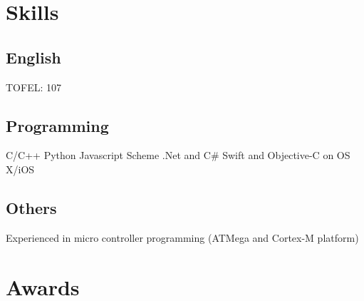 \documentclass[]{deedy-resume-openfont}
\begin{document}
\begin{minipage}[t]{0.35\textwidth}
\section{Skills}
\subsection{English}
TOFEL: 107
\subsection{Programming}
C/C++ \textbullet{} Python \textbullet{} Javascript  \textbullet{} Scheme  \textbullet{} .Net and C\# \textbullet{} Swift and Objective-C on OS X/iOS
\subsection{Others}
Experienced in micro controller programming (ATMega and Cortex-M platform)
\sectionsep



\section{Awards} 


\end{minipage}
\end{document}
